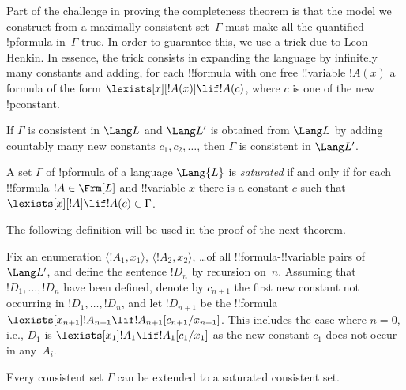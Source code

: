 \documentclass[../../include/open-logic-section]{subfiles}
\begin{document}

\begin{explain}
Part of the challenge in proving the completeness theorem is that the
model we construct from a maximally consistent set~$\Gamma$ must make
all the quantified !p{formula} in~$\Gamma$ true.  In order to
guarantee this, we use a trick due to Leon Henkin.  In essence, the
trick consists in expanding the language by infinitely many constants
and adding, for each !!{formula} with one free !!{variable} $!A(x)$ a
formula of the form $\lexists[x][!A(x)] \lif !A(c)$, where $c$ is one
of the new !p{constant}.
\end{explain}

\begin{lem}
If $\Gamma$ is consistent in $\Lang L$ and $\Lang L'$ is obtained from
$\Lang L$ by adding countably many new constants $c_1, c_2, \dots$,
then $\Gamma$ is consistent in $\Lang L'$.
\end{lem}

\begin{defn}
  A set $\Gamma$ of !p{formula} of a language $\Lang {L}$ is
  \emph{saturated} if and only if for each !!{formula} $!A \in
  \Frm[L]$ and !!{variable} $x$ there is a constant $c$ such that
  $\lexists[x][!A] \lif !A(c) \in \Gamma$.
\end{defn}


The following definition will be used in the proof of the next theorem.

\begin{defn}
Fix an enumeration $\langle !A_1, x_1 \rangle$, $\langle !A_2, x_2
\rangle$, \dots of all !!{formula}-!!{variable} pairs of $\Lang L'$,
and define the sentence $!D_n$ by recursion on~$n$. Assuming that
$!D_1, \dots, !D_n$ have been defined, denote by $c_{n+1}$ the first
new constant not occurring in $!D_1, \dots, !D_n$, and let $!D_{n+1}$
be the !!{formula} $\lexists[x_{n+1}] !A_{n+1} \lif
!A_{n+1}[c_{n+1}/x_{n+1}]$. This includes the case where $n = 0$,
i.e., $D_1$ is $\lexists[x_1] !A_1 \lif !A_1[c_1/x_1]$ as the new
constant $c_1$ does not occur in any~$A_i$.
\end{defn}

\begin{thm}
  Every consistent set $\Gamma$ can be extended to a saturated
  consistent set.
\end{thm}
\end{document}

